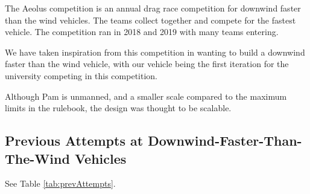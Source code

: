 The Aeolus competition is an annual drag race competition for downwind faster than the wind vehicles. The teams collect together and compete for the fastest vehicle. The competition ran in 2018 and 2019 with many teams entering.

We have taken inspiration from this competition in wanting to build a downwind faster than the wind vehicle, with our vehicle being the first iteration for the university competing in this competition.

Although Pam is unmanned, and a smaller scale compared to the maximum limits in the rulebook, the design was thought to be scalable. 

\subsection{Previous Attempts at Downwind-Faster-Than-The-Wind Vehicles}

See Table \ref{tab:prevAttempts}.

%
